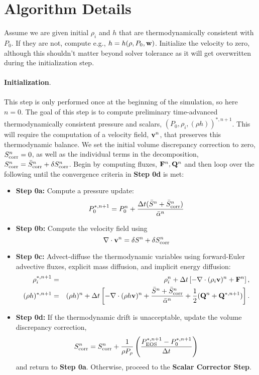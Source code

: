 \documentclass[final]{siamltex}
\def\Fb {{\bf F}}
\def\Qb {{\bf Q}}
\def\vb {{\bf v}}
\def\wb {{\bf w}}
\begin{document}
\section{Algorithm Details}
Assume we are given initial $\rho_i$ and $h$ that are thermodynamically consistent with 
$P_0$.  If they are not, compute e.g., $h = h(\rho,P_0,\wb)$.  Initialize the velocity
to zero, although this shouldn't matter beyond solver tolerance as it will get 
overwritten during the initialization step.\\ \\
{\bf Initialization}.\\ \\
This step is only performed once at the beginning of the simulation, so here $n=0$.
The goal of this step is to compute preliminary time-advanced thermodynamically
consistent pressure and scalars, $(P_0,\rho_i,(\rho h))^{*,n+1}$.  This will
require the computation of a velocity field, $\vb^n$, that preserves this
thermodynamic balance.  
We set the initial volume discrepancy correction to zero, 
$S_{\rm corr}^n = 0$, as well as the individual terms in the decomposition,
$S_{\rm corr}^n = \bar{S}_{\rm corr}^n + \delta S_{\rm corr}^n$.
Begin by computing fluxes, $\Fb^n, \Qb^n$ and then
loop over the following until the convergence criteria in {\bf Step 0d} is met:\\
\begin{itemize}
\item {\bf Step 0a:} Compute a pressure update:
\begin{equation}
P_0^{*,n+1} = P_0^n + \frac{\Delta t(\bar{S}^n + \bar{S}_{\rm corr}^n)}{\bar{\alpha}^n}
\end{equation}
\item {\bf Step 0b:} Compute the velocity field using
\begin{equation}
\nabla\cdot\vb^n = \delta S^n + \delta S_{\rm corr}^n
\end{equation}
\item {\bf Step 0c:} Advect-diffuse the thermodynamic variables using forward-Euler advective fluxes,
explicit mass diffusion, and implicit energy diffusion:
\begin{eqnarray}
\rho_i^{*,n+1} &=& \rho_i^n + \Delta t\left[-\nabla\cdot(\rho_i\vb)^n + \Fb^n\right], \\
(\rho h)^{*,n+1} &=& (\rho h)^n + \Delta t\left[-\nabla\cdot(\rho h\vb)^n + \frac{\bar{S}^n + \bar{S}_{\rm corr}^n}{\bar{\alpha}^n} + \frac{1}{2}(\Qb^n + \Qb^{*,n+1})\right].\nonumber\\
\end{eqnarray}
\item {\bf Step 0d:} If the thermodynamic drift is unacceptable, update the volume 
discrepancy correction,
\begin{equation}
S_{\rm corr}^n = S_{\rm corr}^n + \frac{1}{\rho P_\rho}\left(\frac{P_{\rm EOS}^{*,n+1} - P_0^{*,n+1}}{\Delta t}\right)
\end{equation}
and return to {\bf Step 0a}.  Otherwise, proceed to the {\bf Scalar Corrector Step}.\\
\end{itemize}
\end{document}
